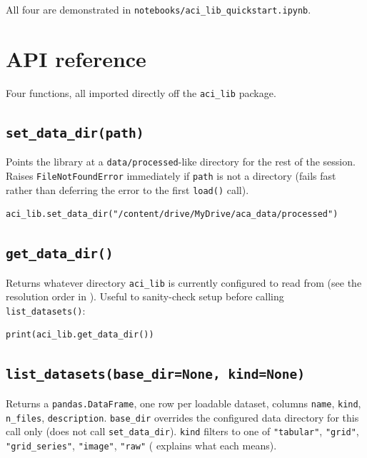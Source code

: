 \documentclass[11pt]{article}
\begin{document}
All four are demonstrated in \texttt{notebooks/aci\_lib\_quickstart.ipynb}.

\section{API reference}
\label{sec:api}

Four functions, all imported directly off the \texttt{aci\_lib} package.

\subsection{\texttt{set\_data\_dir(path)}}

Points the library at a \texttt{data/processed}-like directory for the
rest of the session. Raises \texttt{FileNotFoundError} immediately if
\texttt{path} is not a directory (fails fast rather than deferring the
error to the first \texttt{load()} call).

\begin{lstlisting}
aci_lib.set_data_dir("/content/drive/MyDrive/aca_data/processed")
\end{lstlisting}

\subsection{\texttt{get\_data\_dir()}}

Returns whatever directory \texttt{aci\_lib} is currently configured to
read from (see the resolution order in ). Useful to
sanity-check setup before calling \texttt{list\_datasets()}:

\begin{lstlisting}
print(aci_lib.get_data_dir())
\end{lstlisting}

\subsection{\texttt{list\_datasets(base\_dir=None, kind=None)}}

Returns a \texttt{pandas.DataFrame}, one row per loadable dataset, columns
\texttt{name}, \texttt{kind}, \texttt{n\_files}, \texttt{description}.
\texttt{base\_dir} overrides the configured data directory for this call
only (does not call \texttt{set\_data\_dir}). \texttt{kind} filters to one
of \texttt{"tabular"}, \texttt{"grid"}, \texttt{"grid\_series"},
\texttt{"image"}, \texttt{"raw"} ( explains what each
means).
\end{document}
